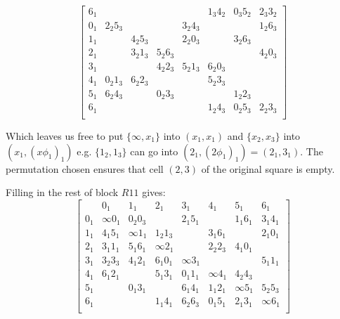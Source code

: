 \begin{example}
\begin{equation*}
\begin{bmatrix}
   6_{1} &            &            &             &            & 1_{3}4_{2}  & 0_{3}5_{2} & 2_{3}3_{2} \\
   0_{1} & 2_{2}5_{3} &            &             & 3_{2}4_{3} &             &            & 1_{2}6_{3} \\
   1_{1} &            & 4_{2}5_{3} &             & 2_{2}0_{3} &             & 3_{2}6_{3} &            \\
   2_{1} &            & 3_{2}1_{3} &  5_{2}6_{3} &            &             &            & 4_{2}0_{3} \\
   3_{1} &            &            &  4_{2}2_{3} & 5_{2}1_{3} & 6_{2}0_{3}  &            &            \\
   4_{1} & 0_{2}1_{3} & 6_{2}2_{3} &             &            & 5_{2}3_{3}  &            &            \\
   5_{1} & 6_{2}4_{3} &            &  0_{2}3_{3} &            &             & 1_{2}2_{3} &            \\
   6_{1} &            &            &             &            & 1_{2}4_{3}  & 0_{2}5_{3} & 2_{2}3_{3} \\
  \end{bmatrix}
\end{equation*}

Which leaves us free to put $\{\infty, x_1\}$ into $(x_1, x_1)$ and $\{x_2, x_3\}$ into $(x_1, (x\phi _1)_1)$ e.g. $\{1_2, 1_3\}$ can go into $(2_1, (2\phi _1)_1) = (2_1,3_1)$.
The permutation chosen ensures that cell $(2, 3)$ of the original square is empty.

Filling in the rest of block $R11$ gives:
\begin{equation*}
  \begin{bmatrix}
         &      0_{1} &   1_{1}    &    2_{1}    &    3_{1}   &    4_{1}    &    5_{1}   &    6_{1}   \\
   0_{1} & \infty     0_{1} & 0_{2}0_{3} &             & 2_{1}5_{1} &             & 1_{1}6_{1} & 3_{1}4_{1} \\
   1_{1} & 4_{1}5_{1} & \infty     1_{1} &  1_{2}1_{3} &            & 3_{1}6_{1}  &            & 2_{1}0_{1} \\
   2_{1} & 3_{1}1_{1} & 5_{1}6_{1} &  \infty     2_{1} &            & 2_{2}2_{3}  & 4_{1}0_{1} &            \\
   3_{1} & 3_{2}3_{3} & 4_{1}2_{1} &  6_{1}0_{1} & \infty     3_{1} &             &            & 5_{1}1_{1} \\ 
   4_{1} & 6_{1}2_{1} &            &  5_{1}3_{1} & 0_{1}1_{1} & \infty     4_{1}  & 4_{2}4_{3} &            \\
   5_{1} &            & 0_{1}3_{1} &             & 6_{1}4_{1} & 1_{1}2_{1}  & \infty     5_{1} & 5_{2}5_{3} \\
   6_{1} &            &            &  1_{1}4_{1} & 6_{2}6_{3} & 0_{1}5_{1}  & 2_{1}3_{1} & \infty     6_{1} \\
  \end{bmatrix}
\end{equation*}


\end{example}
